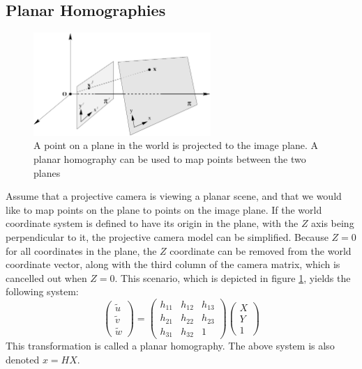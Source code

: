 \subsection{Planar Homographies}\label{planar-homographies}

\begin{figure}[h]
\begin{center}
\includegraphics[width=0.6\textwidth]{figures/planar_homography.pdf}
\end{center}
\caption{A point on a plane in the world is projected to the image plane. A planar homography can be used to map points between the two planes} %
\label{fig:planar_homography}
\end{figure}

Assume that a projective camera is viewing a planar scene, and that we would like to map points on the plane to points on the image plane. 
If the world coordinate system is defined to have its origin in the plane, with the $Z$ axis being perpendicular to it, the projective camera model can be simplified. 
Because $Z=0$ for all coordinates in the plane, the $Z$ coordinate can be removed from the world coordinate vector, along with the third column of the camera matrix, which is cancelled out when $Z=0$. 
This scenario, which is depicted in figure \ref{fig:planar_homography}, yields the following system:
$$\begin{pmatrix} \tilde{u} \\ \tilde{v} \\ \tilde{w} \end{pmatrix} =
\begin{pmatrix} h_{11} & h_{12} & h_{13}  \\
 				h_{21} & h_{22} & h_{23}  \\
				h_{31} & h_{32} & 1\end{pmatrix}
\begin{pmatrix}X \\Y \\ 1\end{pmatrix}$$
This transformation is called a planar homography. 
The above system is also denoted $x=HX$.

